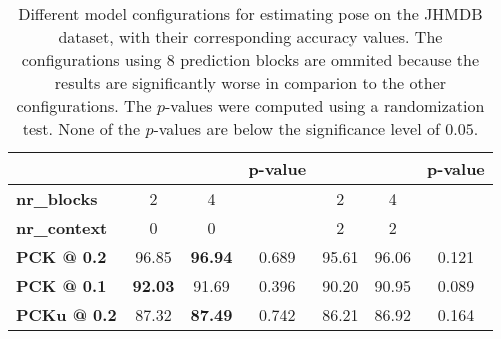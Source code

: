 \begin{table}[]
    \small
    \centering
    \begin{tabular}{|l|c|c|c||c|c|c|}
        \hline
            & & & \textbf{p-value} & & & \textbf{p-value} \\ \hline
            \textbf{nr\_blocks} & 2 & 4 &  & 2 & 4 &  \\ \hline
            \textbf{nr\_context} & 0 & 0 & & 2 & 2 & \\ \hline
            \textbf{PCK @ 0.2} & 96.85 & \textbf{96.94} & 0.689 & 95.61 & 96.06 & 0.121 \\ \hline
            \textbf{PCK @ 0.1} & \textbf{92.03} & 91.69 & 0.396 & 90.20 & 90.95 & 0.089 \\ \hline
            \textbf{PCKu @ 0.2} & 87.32 & \textbf{87.49} & 0.742 & 86.21 & 86.92 & 0.164 \\ \hline
        \end{tabular}
    \caption{Different model configurations for estimating pose on the JHMDB dataset, with their corresponding accuracy values. The configurations using $8$ prediction blocks are ommited because the results are significantly worse in comparion to the other configurations. The $p$-values were computed using a randomization test. None of the $p$-values are below the significance level of $0.05$.}
    \label{tab:jhmdb_results_confidence}
\end{table}

